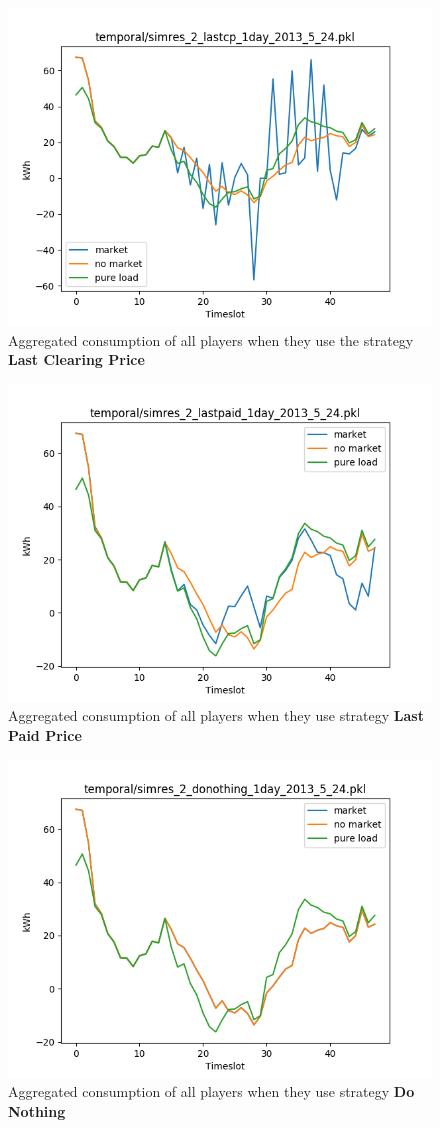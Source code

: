 \documentclass{article}
\begin{document}
\begin{figure}[htpb]
	\centering
	\includegraphics[width=0.8\linewidth]{img/lastcp2013524.png}
	\caption{Aggregated consumption of all players when they use the strategy \textbf{Last Clearing Price}}
	\label{fig:img/lastcp2013524}
\end{figure}


\begin{figure}[htpb]
	\centering
	\includegraphics[width=0.8\linewidth]{img/lastpaid2013524.png}
	\caption{Aggregated consumption of all players when they use strategy \textbf{Last Paid Price}}
	\label{fig:img/lastpaid2013524}
\end{figure}

\begin{figure}[htpb]
	\centering
	\includegraphics[width=0.8\linewidth]{img/donothing2013524.png}
	\caption{Aggregated consumption of all players when they use strategy \textbf{Do Nothing}}
	\label{fig:img/donothing2013524}
\end{figure}
\end{document}
